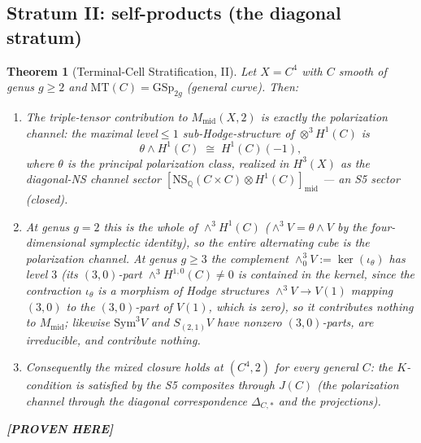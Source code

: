 \documentclass[11pt]{article}
\newtheorem{theorem}{Theorem}
\newcommand{\PROVEN}{\textbf{[PROVEN HERE]}}
\newcommand{\Q}{\mathbb{Q}}
\newcommand{\MT}{\mathrm{MT}}
\newcommand{\GSp}{\mathrm{GSp}}
\newcommand{\NS}{\mathrm{NS}}
\begin{document}
\subsection{Stratum II: self-products (the diagonal stratum)}

\begin{theorem}[Terminal-Cell Stratification, II]\label{thm:s8b}
Let $X=C^4$ with $C$ smooth of genus $g\ge2$ and $\MT(C)=\GSp_{2g}$
(general curve). Then:
\begin{enumerate}[label=(\alph*)]
\item The triple-tensor contribution to $M_{\mathrm{mid}}(X,2)$ is
\emph{exactly} the polarization channel: the maximal level${}\le1$
sub-Hodge-structure of $\otimes^{3}H^{1}(C)$ is
\[
\theta\wedge H^{1}(C)\;\cong\;H^{1}(C)(-1),
\]
where $\theta$ is the principal polarization class, realized in
$H^{3}(X)$ as the diagonal-NS channel sector
$[\NS_\Q(C\times C)\otimes H^1(C)]_{\mathrm{mid}}$ --- an
S5 sector (closed).
\item At genus $g=2$ this is the \emph{whole} of
$\wedge^3 H^1(C)$ ($\wedge^3V=\theta\wedge V$ by the four-dimensional
symplectic identity), so the entire alternating cube is the polarization
channel. At genus $g\ge3$ the complement
$\wedge^3_0V:=\ker(\iota_\theta)$ has level $3$ (its $(3,0)$-part
$\wedge^3H^{1,0}(C)\ne0$ is contained in the kernel, since the
contraction $\iota_\theta$ is a morphism of Hodge structures
$\wedge^3V\to V(1)$ mapping $(3,0)$ to the $(3,0)$-part of $V(1)$,
which is zero), so it contributes \emph{nothing} to
$M_{\mathrm{mid}}$; likewise $\mathrm{Sym}^3V$ and $S_{(2,1)}V$ have
nonzero $(3,0)$-parts, are irreducible, and contribute nothing.
\item Consequently the mixed closure holds at $(C^4,2)$ for every
general $C$: the $K$-condition is satisfied by the S5 composites through
$J(C)$ (the polarization channel through the diagonal correspondence
$\Delta_{C,*}$ and the projections).
\end{enumerate}
\PROVEN{}
\end{theorem}
\end{document}
